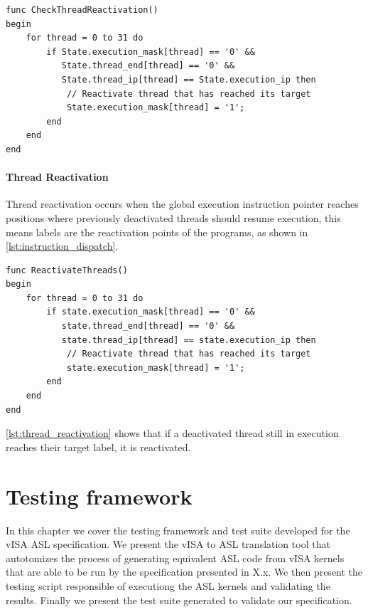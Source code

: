 \begin{lstlisting}[caption={Thread Reactivation Logic}, label={lst:thread_reactivation}]
func CheckThreadReactivation()
begin
    for thread = 0 to 31 do
        if State.execution_mask[thread] == '0' && 
           State.thread_end[thread] == '0' &&
           State.thread_ip[thread] == State.execution_ip then
            // Reactivate thread that has reached its target
            State.execution_mask[thread] = '1';
        end
    end
end
\end{lstlisting}

\subsubsection{Thread Reactivation}
Thread reactivation occurs when the global execution instruction pointer
reaches positions where previously deactivated threads should resume execution,
this means labels are the reactivation points of the programs, as shown in
\ref{lst:instruction_dispatch}.

\begin{lstlisting}[caption={Thread Reactivation Logic}, label={lst:thread_reactivation}]
func ReactivateThreads()
begin
    for thread = 0 to 31 do
        if state.execution_mask[thread] == '0' && 
           state.thread_end[thread] == '0' &&
           state.thread_ip[thread] == state.execution_ip then
            // Reactivate thread that has reached its target
            state.execution_mask[thread] = '1';
        end
    end
end
\end{lstlisting}
\ref{lst:thread_reactivation} shows that if a deactivated thread still in
execution reaches their target label, it is reactivated.

\chapter{Testing framework}
In this chapter we cover the testing framework and test suite developed for the
vISA ASL specification. We present the vISA to ASL translation tool that
autotomizes the process of generating equivalent ASL code from vISA kernels
that are able to be run by the specification presented in X.x. We then present
the testing script responsible of executiong the ASL kernels and validating the
results. Finally we present the test suite generated to validate our
specification.


